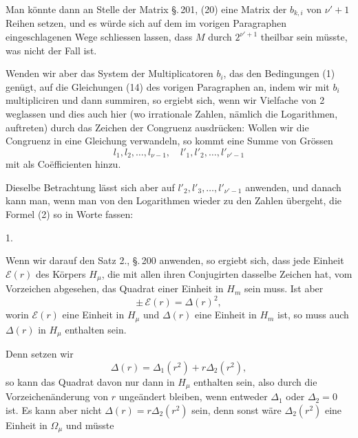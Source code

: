 Man könnte dann an Stelle der Matrix \S.\,201, (20) eine Matrix
der $b_{k,i}$ von $\nu'+1$ Reihen setzen, und es würde sich auf
dem im vorigen Paragraphen eingeschlagenen Wege schliessen
lassen, dass $M$ durch $2^{\nu'+1}$ theilbar sein müsste, was
nicht der Fall ist.

Wenden wir aber das System der Multiplicatoren $b_i$, das den
Bedingungen (1) genügt, auf die Gleichungen (14) des vorigen
Paragraphen an, indem wir mit $b_i$ multipliciren und dann
summiren, so ergiebt sich, wenn wir Vielfache von 2 weglassen
und dies auch hier (wo irrationale Zahlen, nämlich die
Logarithmen, auftreten) durch das Zeichen der Congruenz
ausdrücken:
Wollen wir die Congruenz in eine Gleichung verwandeln, so kommt
eine Summe von Grössen
\[ l_1, l_2, \ldots, l_{\nu-1}, \quad l'_1, l'_2, \ldots, l'_{\nu'-1} \]
mit  als Co\"efficienten hinzu.

Dieselbe Betrachtung lässt sich aber auf $l'_2, l'_3, \ldots,
l'_{\nu'-1}$ anwenden, und danach kann man, wenn man von den
Logarithmen wieder zu den Zahlen übergeht, die Formel (2) so
in Worte fassen:

1. 

Wenn wir darauf den Satz 2., \S.\,200 anwenden, so ergiebt
sich, dass jede Einheit $\mathcal{E}(r)$ des Körpers $H_\mu$,
die mit allen ihren Conjugirten dasselbe Zeichen hat, vom
Vorzeichen abgesehen, das Quadrat einer Einheit in $H_m$ sein
muss. Ist aber
\[ \pm\, \mathcal{E}(r) = \Delta(r)^2, \]
worin $\mathcal{E}(r)$ eine Einheit in $H_\mu$ und $\Delta(r)$
eine Einheit in $H_m$ ist, so muss auch $\Delta(r)$ in $H_\mu$
enthalten sein.

Denn setzen wir
\[ \Delta(r) = \Delta_1(r^2) + r \Delta_2(r^2), \]
so kann das Quadrat davon nur dann in $H_\mu$ enthalten sein,
also durch die Vorzeichenänderung von $r$ ungeändert bleiben,
wenn entweder $\Delta_1$ oder $\Delta_2 = 0$ ist. Es kann aber
nicht $\Delta(r) = r \Delta_2(r^2)$ sein, denn sonst wäre
$\Delta_2(r^2)$ eine Einheit in $\Omega_\mu$ und müsste

